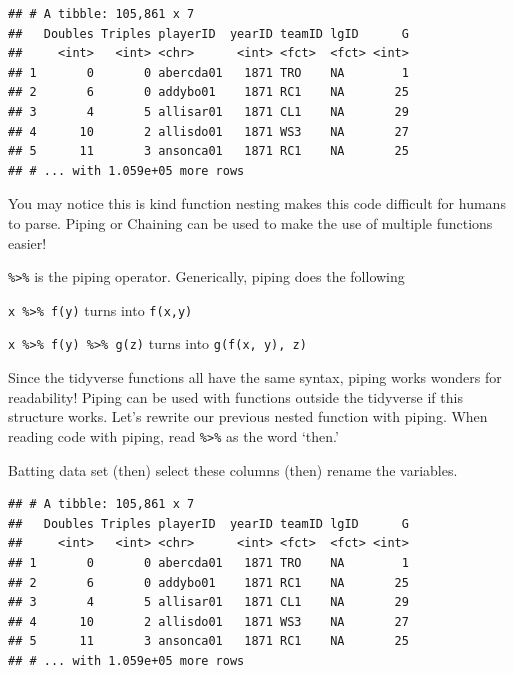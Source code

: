 \documentclass[
]{book}
\newenvironment{Shaded}{\begin{snugshade}}{\end{snugshade}}
\newcommand{\KeywordTok}[1]{\textcolor[rgb]{0.13,0.29,0.53}{\textbf{#1}}}
\newcommand{\NormalTok}[1]{#1}
\newcommand{\OperatorTok}[1]{\textcolor[rgb]{0.81,0.36,0.00}{\textbf{#1}}}
\newcommand{\StringTok}[1]{\textcolor[rgb]{0.31,0.60,0.02}{#1}}
\theoremstyle{definition}
\theoremstyle{definition}
\theoremstyle{definition}
\theoremstyle{remark}
\begin{document}
\begin{verbatim}
## # A tibble: 105,861 x 7
##   Doubles Triples playerID  yearID teamID lgID      G
##     <int>   <int> <chr>      <int> <fct>  <fct> <int>
## 1       0       0 abercda01   1871 TRO    NA        1
## 2       6       0 addybo01    1871 RC1    NA       25
## 3       4       5 allisar01   1871 CL1    NA       29
## 4      10       2 allisdo01   1871 WS3    NA       27
## 5      11       3 ansonca01   1871 RC1    NA       25
## # ... with 1.059e+05 more rows
\end{verbatim}

You may notice this is kind function nesting makes this code difficult for humans to parse. Piping or Chaining can be used to make the use of multiple functions easier!

\texttt{\%\textgreater{}\%} is the piping operator. Generically, piping does the following

\texttt{x\ \%\textgreater{}\%\ f(y)} turns into \texttt{f(x,y)}

\texttt{x\ \%\textgreater{}\%\ f(y)\ \%\textgreater{}\%\ g(z)} turns into \texttt{g(f(x,\ y),\ z)}

Since the tidyverse functions all have the same syntax, piping works wonders for readability! Piping can be used with functions outside the tidyverse if this structure works. Let's rewrite our previous nested function with piping. When reading code with piping, read \texttt{\%\textgreater{}\%} as the word `then.'

Batting data set (then) select these columns (then) rename the variables.

\begin{Shaded}
\end{Shaded}

\begin{verbatim}
## # A tibble: 105,861 x 7
##   Doubles Triples playerID  yearID teamID lgID      G
##     <int>   <int> <chr>      <int> <fct>  <fct> <int>
## 1       0       0 abercda01   1871 TRO    NA        1
## 2       6       0 addybo01    1871 RC1    NA       25
## 3       4       5 allisar01   1871 CL1    NA       29
## 4      10       2 allisdo01   1871 WS3    NA       27
## 5      11       3 ansonca01   1871 RC1    NA       25
## # ... with 1.059e+05 more rows
\end{verbatim}
\end{document}
